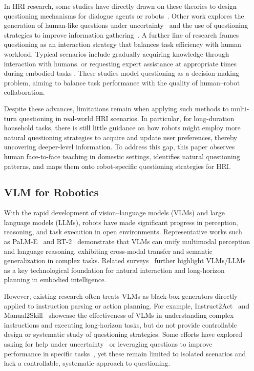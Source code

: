 \documentclass[sigconf,authordraft]{acmart}
\begin{document}
In HRI research, some studies have directly drawn on these theories to design questioning mechanisms for dialogue agents or robots~\cite{hu2024designing,cakmak2012designing,habibian2022here}. Other work explores the generation of human-like questions under uncertainty~\cite{shin2023uncertainty} and the use of questioning strategies to improve information gathering~\cite{hu2025task}. A further line of research frames questioning as an interaction strategy that balances task efficiency with human workload. Typical scenarios include gradually acquiring knowledge through interaction with humans.\cite{adamson2021we} or requesting expert assistance at appropriate times during embodied tasks \cite{singh2022ask4help}. These studies model questioning as a decision-making problem, aiming to balance task performance with the quality of human–robot collaboration.

Despite these advances, limitations remain when applying such methods to multi-turn questioning in real-world HRI scenarios. In particular, for long-duration household tasks, there is still little guidance on how robots might employ more natural questioning strategies to acquire and update user preferences, thereby uncovering deeper-level information. To address this gap, this paper observes human face-to-face teaching in domestic settings, identifies natural questioning patterns, and maps them onto robot-specific questioning strategies for HRI.

\subsection{VLM for Robotics}
With the rapid development of vision–language models (VLMs) and large language models (LLMs), robots have made significant progress in perception, reasoning, and task execution in open environments. Representative works such as PaLM-E~\cite{driess2023palm} and RT-2~\cite{zitkovich2023rt} demonstrate that VLMs can unify multimodal perception and language reasoning, exhibiting cross-modal transfer and semantic generalization in complex tasks. Related surveys~\cite{ma2024survey,zeng2023large} further highlight VLMs/LLMs as a key technological foundation for natural interaction and long-horizon planning in embodied intelligence.

However, existing research often treats VLMs as black-box generators directly applied to instruction parsing or action planning. For example, Instruct2Act~\cite{huang2023instruct2act} and Manual2Skill~\cite{tie2025manual2skill} showcase the effectiveness of VLMs in understanding complex instructions and executing long-horizon tasks, but do not provide controllable design or systematic study of questioning strategies. Some efforts have explored asking for help under uncertainty~\cite{3ren2023robots,5ramrakhya2025grounding} or leveraging questions to improve performance in specific tasks~\cite{4andukuri2024star,shen2025elba}, yet these remain limited to isolated scenarios and lack a controllable, systematic approach to questioning.
\end{document}
